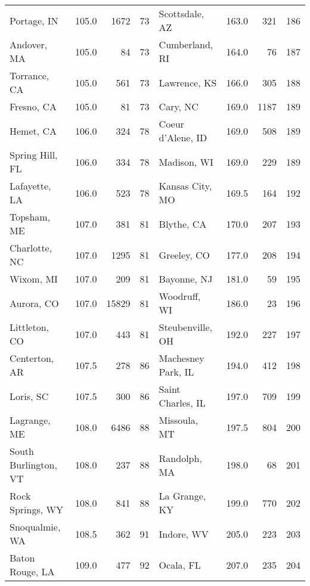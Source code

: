 \begin{longtable}{lrrr|lrrr}
Portage, IN          &   105.0 &   1672 &    73 & Scottsdale, AZ       &   163.0 &    321 &   186 \\
Andover, MA          &   105.0 &     84 &    73 & Cumberland, RI       &   164.0 &     76 &   187 \\
Torrance, CA         &   105.0 &    561 &    73 & Lawrence, KS         &   166.0 &    305 &   188 \\
Fresno, CA           &   105.0 &     81 &    73 & Cary, NC             &   169.0 &   1187 &   189 \\
Hemet, CA            &   106.0 &    324 &    78 & Coeur d'Alene, ID    &   169.0 &    508 &   189 \\
Spring Hill, FL      &   106.0 &    334 &    78 & Madison, WI          &   169.0 &    229 &   189 \\
Lafayette, LA        &   106.0 &    523 &    78 & Kansas City, MO      &   169.5 &    164 &   192 \\
Topsham, ME          &   107.0 &    381 &    81 & Blythe, CA           &   170.0 &    207 &   193 \\
Charlotte, NC        &   107.0 &   1295 &    81 & Greeley, CO          &   177.0 &    208 &   194 \\
Wixom, MI            &   107.0 &    209 &    81 & Bayonne, NJ          &   181.0 &     59 &   195 \\
Aurora, CO           &   107.0 &  15829 &    81 & Woodruff, WI         &   186.0 &     23 &   196 \\
Littleton, CO        &   107.0 &    443 &    81 & Steubenville, OH     &   192.0 &    227 &   197 \\
Centerton, AR        &   107.5 &    278 &    86 & Machesney Park, IL   &   194.0 &    412 &   198 \\
Loris, SC            &   107.5 &    300 &    86 & Saint Charles, IL    &   197.0 &    709 &   199 \\
Lagrange, ME         &   108.0 &   6486 &    88 & Missoula, MT         &   197.5 &    804 &   200 \\
South Burlington, VT &   108.0 &    237 &    88 & Randolph, MA         &   198.0 &     68 &   201 \\
Rock Springs, WY     &   108.0 &    841 &    88 & La Grange, KY        &   199.0 &    770 &   202 \\
Snoqualmie, WA       &   108.5 &    362 &    91 & Indore, WV           &   205.0 &    223 &   203 \\
Baton Rouge, LA      &   109.0 &    477 &    92 & Ocala, FL            &   207.0 &    235 &   204 \\

\end{longtable}
